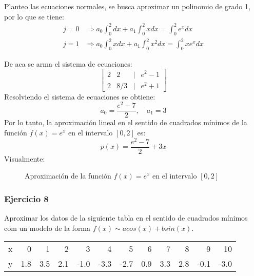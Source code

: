\documentclass{article}
\begin{document}
Planteo las ecuaciones normales, se busca aproximar un polinomio de grado 1, por lo que se tiene:
\begin{align}
    j = 0 &\Rightarrow a_0 \int_{0}^{2} dx + a_1 \int_{0}^{2} x dx = \int_{0}^{2} e^x dx \\
    j = 1 &\Rightarrow a_0 \int_{0}^{2} x dx + a_1 \int_{0}^{2} x^2 dx = \int_{0}^{2} x e^x dx
\end{align}

De aca se arma el sistema de ecuaciones:
\begin{equation}
    \begin{bmatrix}
        2 & 2 & | & e^2 - 1 \\
        2 & 8/3 & | & e^2 + 1
    \end{bmatrix}
\end{equation}
Resolviendo el sistema de ecuaciones se obtiene:
\begin{equation}
    a_0 = \frac{e^2 - 7}{2}, \quad a_1 = 3
\end{equation}
Por lo tanto, la aproximación lineal en el sentido de cuadrados mínimos de la función \( f(x) = e^x \) en el intervalo \([0,2]\) es:
\begin{equation}
    p(x) = \frac{e^2 - 7}{2} + 3x
\end{equation}
\newpage
Visualmente:
\begin{figure}[h]
    \centering
    \caption{Aproximación de la función \( f(x) = e^x \) en el intervalo \([0,2]\)}
    \label{fig:myplot11}
\end{figure}

\subsubsection{Ejercicio 8}
Aproximar los datos de la siguiente tabla en el sentido de cuadrados mínimos com un modelo de la forma $f(x) \sim a cos(x) + b sin(x)$.
\begin{center}
    \begin{tabular}{||r||r|r|r|r|r|r|r|r|r|r|r||}
    \hline
    x & 0 & 1 & 2 & 3 & 4 & 5 & 6 & 7 & 8 & 9 & 10 \\
    y & 1.8 & 3.5 & 2.1 & -1.0 & -3.3 & -2.7 & 0.9 & 3.3 & 2.8 & -0.1 & -3.0 \\
    \hline
    \end{tabular}
\end{center}
\end{document}
